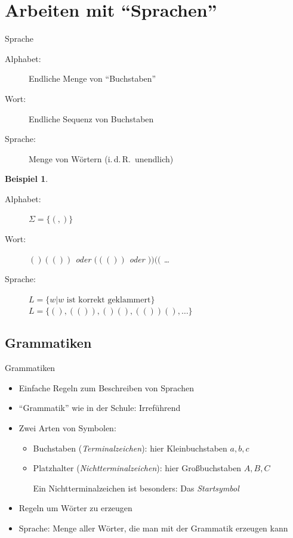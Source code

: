 \documentclass{beamer}
\theoremstyle{example}
\newtheorem{ex}{Beispiel}
\renewenvironment{example}{\begin{ex}}{\end{ex}}
\begin{document}
\section{Arbeiten mit ``Sprachen''}
\begin{frame}{Sprache}
  \begin{definition}
    \begin{description}
    \item[Alphabet:] Endliche Menge von ``Buchstaben''
    \item[Wort:] Endliche Sequenz von Buchstaben
    \item[Sprache:] Menge von Wörtern (i.\,d.\,R.\ unendlich)
    \end{description}
  \end{definition}
  \begin{example}
    \begin{description}
    \item[Alphabet:] $\Sigma = \{ (,)\}$
    \item[Wort:] $()(())$ oder $((())$ oder $))(($ \ldots
    \item[Sprache:] $L=\{w | \text{$w$ ist korrekt geklammert}\}$
      $L = \{(),(()),()(),(())(),\ldots\}$
    \end{description}
  \end{example}
\end{frame}

\subsection{Grammatiken}
\begin{frame}{Grammatiken}
  \begin{itemize}
  \item Einfache Regeln zum Beschreiben von Sprachen
  \item ``Grammatik'' wie in der Schule: Irreführend
  \item Zwei Arten von Symbolen:
    \begin{itemize}
    \item Buchstaben (\emph{Terminalzeichen}): hier Kleinbuchstaben $a,b,c$
    \item Platzhalter (\emph{Nichtterminalzeichen}): hier Großbuchstaben $A,B,C$

      Ein Nichtterminalzeichen ist besonders: Das \emph{Startsymbol}
    \end{itemize}
  \item Regeln um Wörter zu erzeugen
  \item Sprache: Menge aller Wörter, die man mit der Grammatik erzeugen kann
  \end{itemize}
\end{frame}
\end{document}
